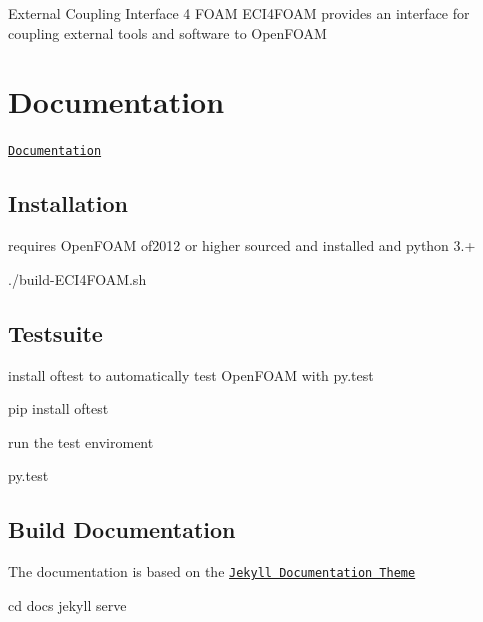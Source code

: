 External Coupling Interface 4 F\+O\+AM E\+C\+I4\+F\+O\+AM provides an interface for coupling external tools and software to Open\+F\+O\+AM

\section*{Documentation}

\href{https://DLR-RY.github.io/ECI4FOAM/}{\tt Documentation}

\subsection*{Installation}

requires Open\+F\+O\+AM of2012 or higher sourced and installed and python 3.+


\begin{DoxyCode}
./build-ECI4FOAM.sh
\end{DoxyCode}
 \subsection*{Testsuite}

install oftest to automatically test Open\+F\+O\+AM with py.\+test


\begin{DoxyCode}
pip install oftest
\end{DoxyCode}


run the test enviroment 
\begin{DoxyCode}
py.test
\end{DoxyCode}


\subsection*{Build Documentation}

The documentation is based on the \href{https://idratherbewriting.com/documentation-theme-jekyll/}{\tt Jekyll Documentation Theme}


\begin{DoxyCode}
cd docs
jekyll serve
\end{DoxyCode}
 